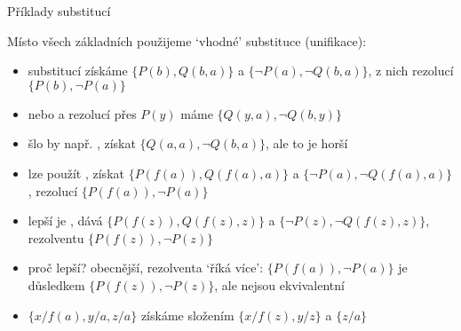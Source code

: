 \documentclass{beamer}
\begin{document}
\begin{frame}{Příklady substitucí}

    \pause
    Místo \alert{všech základních} použijeme \alert{`vhodné'} substituce (\alert{unifikace}):

    \pause
     \vspace{-6pt}
        \pause
        \begin{itemize}
            \item substitucí  získáme $\{P(b),Q(b,a)\}$ a $\{\neg P(a),\neg Q(b,a)\}$, z nich rezolucí $\{P(b),\neg P(a)\}$\pause 
            \item nebo  a rezolucí přes $P(y)$ máme $\{Q(y,a),\neg Q(b,y)\}$\pause 
            \item šlo by např. , získat $\{Q(a,a),\neg Q(b,a)\}$, ale to je \alert{horší}   
        \end{itemize}         
      
    \pause
     \vspace{-6pt}
        \pause 
        \begin{itemize}
            \item lze použít , získat $\{P(f(a)),Q(f(a),a)\}$ a $\{\neg P(a),\neg Q(f(a),a)\}$, rezolucí \alert{$\{P(f(a)),\neg P(a)\}$}\pause 
            \item \alert{lepší} je , dává $\{P(f(z)),Q(f(z),z)\}$ a $\{\neg P(z),\neg Q(f(z),z)\}$, rezolventu \alert{$\{P(f(z)),\neg P(z)\}$}\pause 
            \item proč lepší? \alert{obecnější}, rezolventa `říká více': {\small$\{P(f(a)),\neg P(a)\}$} je důsledkem {\small$\{P(f(z)),\neg P(z)\}$}, ale nejsou ekvivalentní\pause 
            \item $\{x/f(a),y/a,z/a\}$ získáme \alert{složením} $\{x/f(z),y/z\}$ a $\{z/a\}$
        \end{itemize}            

\end{frame}
\end{document}
